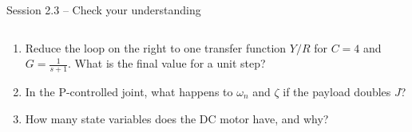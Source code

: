 \documentclass[aspectratio=169,10pt]{beamer}
\begin{document}
\begin{frame}{Session 2.3 -- Check your understanding}
\begin{columns}[T]
\begin{keybox}
\begin{enumerate}
  \item Reduce the loop on the right to one transfer function $Y/R$ for $C=4$ and $G=\frac{1}{s+1}$. What is the final value for a unit step?
  \item In the P-controlled joint, what happens to $\omega_n$ and $\zeta$ if the payload doubles $J$?
  \item How many state variables does the DC motor have, and why?
\end{enumerate}
\end{keybox}
\centering
{}
\end{columns}
\end{frame}
\end{document}
